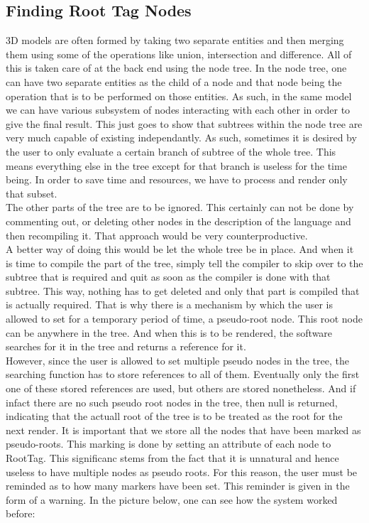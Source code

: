 \subsection{Finding Root Tag Nodes}
3D models are often formed by taking two separate entities and then merging them using some of the operations like union, intersection and difference. All of this is taken care of at the back end using the node tree. In the node tree, one can have two separate entities as the child of a node and that node being the operation that is to be performed on those entities. As such, in the same model we can have various subsystem of nodes interacting with each other in order to give the final result. This just goes to show that subtrees within the node tree are very much capable of existing independantly. As such, sometimes it is desired by the user to only evaluate a certain branch of subtree of the whole tree. This means everything else in the tree except for that branch is useless for the time being. In order to save time and resources, we have to process and render only that subset.\\
The other parts of the tree are to be ignored. This certainly can not be done by commenting out, or deleting other nodes in the description of the language and then recompiling it. That approach would be very counterproductive.\\
A better way of doing this would be let the whole tree be in place. And when it is time to compile the part of the tree, simply tell the compiler to skip over to the subtree that is required and quit as soon as the compiler is done with that subtree. This way, nothing has to get deleted and only that part is compiled that is actually required. That is why there is a mechanism by which the user is allowed to set for a temporary period of time, a pseudo-root node. This root node can be anywhere in the tree. And when this is to be rendered, the software searches for it in the tree and returns a reference for it.\\
However, since the user is allowed to set multiple pseudo nodes in the tree, the searching function has to store references to all of them. Eventually only the first one of these stored references are used, but others are stored nonetheless. And if infact there are no such pseudo root nodes in the tree, then null is returned, indicating that the actuall root of the tree is to be treated as the root for the next render. It is important that we store all the nodes that have been marked as pseudo-roots. This marking is done by setting an attribute of each node to RootTag. This significanc stems from the fact that it is unnatural and hence useless to have multiple nodes as pseudo roots. For this reason, the user must be reminded as to how many markers have been set. This reminder is given in the form of a warning. In the picture below, one can see how the system worked before:\\
